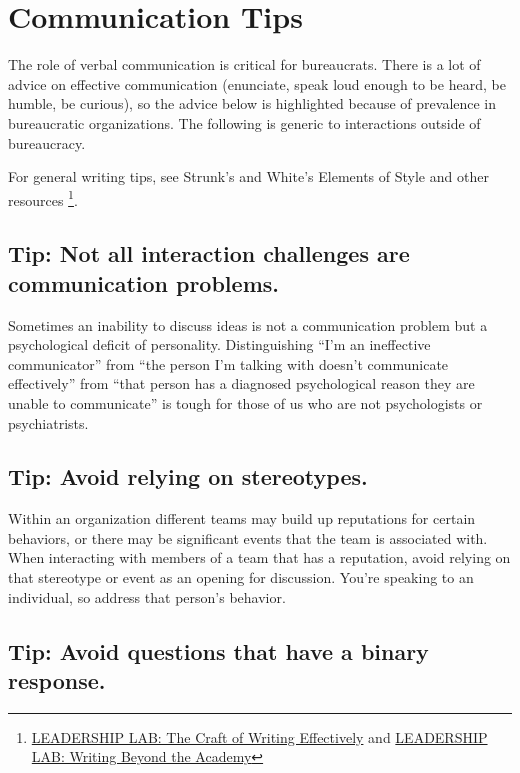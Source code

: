 \section{Communication Tips}

The role of verbal communication is critical for bureaucrats. 
There is a lot of advice on effective communication (enunciate, speak loud enough to be heard, be humble, be curious), so the advice below is highlighted because of prevalence in bureaucratic organizations. 
The following is generic to interactions outside of bureaucracy. 

For general writing tips, see Strunk's and White's Elements of Style and other resources \footnote{\href{https://www.youtube.com/watch?v=vtIzMaLkCaM}{LEADERSHIP LAB: The Craft of Writing Effectively} and \href{https://www.youtube.com/watch?v=aFwVf5a3pZM}{LEADERSHIP LAB: Writing Beyond the Academy}}.

\subsection*{Tip: Not all interaction challenges are communication problems.}
Sometimes an inability to discuss ideas is not a communication problem but a psychological deficit of personality. Distinguishing ``I'm an ineffective communicator'' from ``the person I'm talking with doesn't communicate effectively'' from ``that person has a diagnosed psychological reason they are unable to communicate'' is tough for those of us who are not psychologists or psychiatrists. 


\subsection*{Tip: Avoid relying on stereotypes.}
Within an organization different teams may build up reputations for certain behaviors, or there may be significant events that the team is associated with. 
When interacting with members of a team that has a reputation, avoid relying on that stereotype or event as an opening for discussion. 
You're speaking to an individual, so address that person's behavior.



\subsection*{Tip: Avoid questions that have a binary response\label{sec:yes_no_questions}.}

